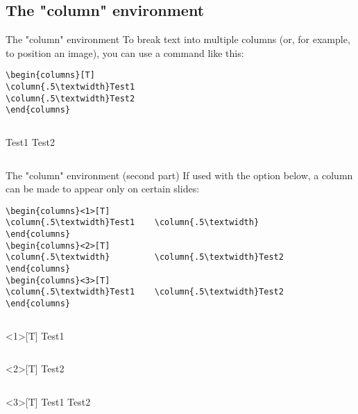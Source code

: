 \subsection{The "column" environment}
\begin{frame}[fragile]{The "column" environment}
To break text into multiple columns (or, for example, to position an image), you can use a command like this:
\begin{verbatim}
\begin{columns}[T]
\column{.5\textwidth}Test1 
\column{.5\textwidth}Test2 
\end{columns} \end{verbatim}
\begin{columns}[T]
Test1 
Test2 
\end{columns}
\end{frame}

\begin{frame}[fragile, shrink=10]{The "column" environment (second part)}
If used with the option below, a column can be made to appear only on certain slides:
\begin{verbatim}
\begin{columns}<1>[T]
\column{.5\textwidth}Test1    \column{.5\textwidth}
\end{columns}
\begin{columns}<2>[T]
\column{.5\textwidth}         \column{.5\textwidth}Test2
\end{columns}
\begin{columns}<3>[T]
\column{.5\textwidth}Test1    \column{.5\textwidth}Test2
\end{columns}
\end{verbatim}
\begin{columns}<1>[T]
Test1
\end{columns}
\begin{columns}<2>[T]
Test2
\end{columns}
\begin{columns}<3>[T]
Test1
Test2
\end{columns}
\end{frame}